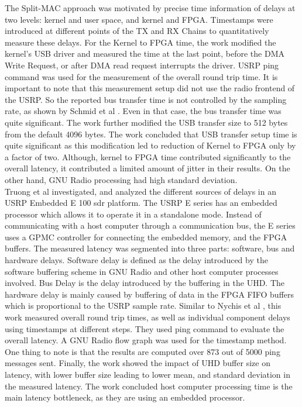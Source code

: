 The Split-MAC approach was motivated by precise time information of delays at two levels: kernel and user space, and kernel and FPGA.
Timestamps were introduced at different points of the TX and RX Chains to quantitatively measure these delays.
For the Kernel to FPGA time, the work modified the kernel's USB driver and measured the time at the last point, before the DMA Write Request, or after DMA read request interrupts the driver.
USRP ping command was used for the  measurement of the overall round trip time.
It is important to note that this measurement setup did not use the radio frontend of the USRP.
So the reported bus transfer time is not controlled by the sampling rate, as shown by Schmid et al \cite{schmid_experimental_2007}.
Even in that case, the bus transfer time was quite significant.
The work further modified the USB transfer size to 512 bytes from the default 4096 bytes.
The work concluded that USB transfer setup time is quite significant as this modification led to reduction of Kernel to FPGA only by a factor of two.
Although, kernel to FPGA time contributed significantly to the overall latency, it contributed a limited amount of jitter in their results.
On the other hand, GNU Radio processing had high standard deviation.\\

Truong et al \cite{truong_investigating_2013} investigated, and analyzed the different sources of delays in an USRP Embedded E 100 \ac{sdr} platform.
The USRP E series has an embedded processor which allows it to operate it in a standalone mode.
Instead of communicating with a host computer through a communication bus, the E series uses a  \ac{GPMC} controller for connecting the embedded memory, and the \ac{FPGA} buffers.
The measured latency was segmented into three parts: software, bus and hardware delays.
Software delay is defined as the delay introduced by the software buffering scheme in GNU Radio and other host computer processes involved.
Bus Delay is the delay introduced by the buffering in the \ac{UHD}.
The hardware delay is mainly caused by buffering of data in the FPGA \ac{FIFO} buffers which is proportional to the USRP sample rate.
Similar to Nychis et al \cite{nychis_enabling_nodate}, this work measured overall round trip times, as well as individual component delays using timestamps at different steps.
They used ping command to evaluate the overall latency.
A GNU Radio flow graph was used for the timestamp method.
One thing to note is that the results are computed over 873 out of 5000 ping messages sent.   
Finally, the work showed the impact of \ac{UHD} buffer size on latency, with lower buffer size leading to lower mean, and standard deviation in the measured latency.
The work concluded host computer processing time is the main latency bottleneck, as they are using an embedded processor. \\




